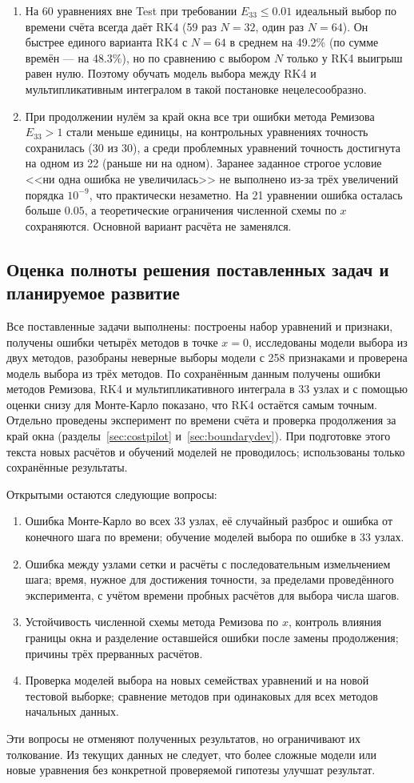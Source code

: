 \documentclass[14pt,a4paper]{extarticle}
\begin{document}
\begin{enumerate}
\item На 60 уравнениях вне Test при требовании $E_{33}\le0.01$ идеальный
выбор по времени счёта всегда даёт RK4 (59 раз $N=32$, один раз $N=64$).
Он быстрее единого варианта RK4 с $N=64$ в среднем на 49.2\% (по сумме
времён --- на 48.3\%), но по сравнению с выбором $N$ только у RK4
выигрыш равен нулю. Поэтому обучать модель выбора между RK4
и мультипликативным интегралом в такой постановке нецелесообразно.
\item При продолжении нулём за край окна все три ошибки метода Ремизова
$E_{33}>1$ стали меньше единицы, на контрольных уравнениях точность
сохранилась (30 из 30), а среди проблемных уравнений точность достигнута
на одном из 22 (раньше ни на одном). Заранее заданное строгое условие
<<ни одна ошибка не увеличилась>> не выполнено из-за трёх увеличений
порядка $10^{-9}$, что практически незаметно. На 21 уравнении ошибка
осталась больше $0.05$, а теоретические ограничения численной схемы
по $x$ сохраняются. Основной вариант расчёта не заменялся.
\end{enumerate}

\subsection{Оценка полноты решения поставленных задач и планируемое развитие}
Все поставленные задачи выполнены: построены набор уравнений
и признаки, получены ошибки четырёх методов в точке $x=0$, исследованы
модели выбора из двух методов, разобраны неверные выборы модели с 258
признаками и проверена модель выбора из трёх методов. По сохранённым
данным получены ошибки методов Ремизова, RK4 и мультипликативного
интеграла в 33 узлах и с помощью оценки снизу для Монте-Карло показано,
что RK4 остаётся самым точным. Отдельно проведены эксперимент по времени
счёта и проверка продолжения за край окна (разделы~\ref{sec:costpilot}
и~\ref{sec:boundarydev}). При подготовке этого текста новых расчётов
и обучений моделей не проводилось; использованы только сохранённые
результаты.

Открытыми остаются следующие вопросы:
\begin{enumerate}
\item Ошибка Монте-Карло во всех 33 узлах, её случайный разброс и ошибка
от конечного шага по времени; обучение моделей выбора по ошибке
в 33 узлах.
\item Ошибка между узлами сетки и расчёты с последовательным
измельчением шага; время, нужное для достижения точности, за пределами
проведённого эксперимента, с учётом времени пробных расчётов для выбора
числа шагов.
\item Устойчивость численной схемы метода Ремизова по $x$, контроль
влияния границы окна и разделение оставшейся ошибки после замены
продолжения; причины трёх прерванных расчётов.
\item Проверка моделей выбора на новых семействах уравнений и на новой
тестовой выборке; сравнение методов при одинаковых для всех методов
начальных данных.
\end{enumerate}
Эти вопросы не отменяют полученных результатов, но ограничивают
их толкование. Из текущих данных не следует, что более сложные модели
или новые уравнения без конкретной проверяемой гипотезы улучшат
результат.
\end{document}
